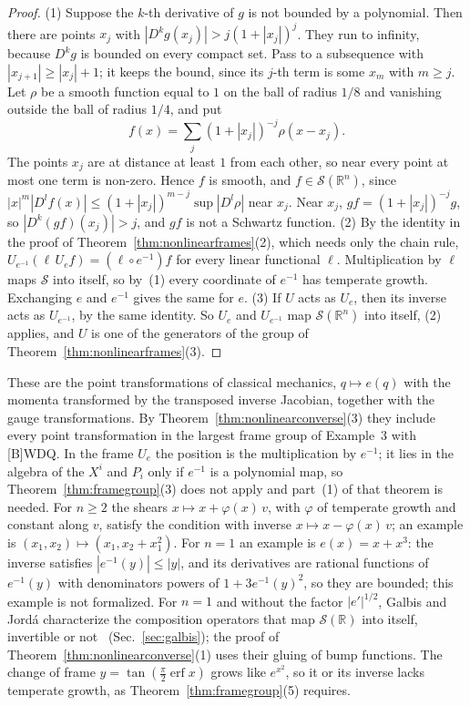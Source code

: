 \documentclass[11pt]{article}
\theoremstyle{definition}
\begin{document}
\begin{proof}
  (1) Suppose the $k$-th derivative of $g$ is not bounded by a polynomial. Then there are points
  $x_j$ with $|D^k g(x_j)| > j(1 + |x_j|)^j$. They run to infinity, because $D^k g$ is bounded on
  every compact set. Pass to a subsequence with $|x_{j+1}| \ge |x_j| + 1$; it keeps the bound,
  since its $j$-th term is some $x_m$ with $m \ge j$. Let $\rho$ be a smooth function equal to $1$
  on the ball of radius $1/8$ and vanishing outside the ball of radius $1/4$, and put
  \[
    f(x) = \sum_j (1 + |x_j|)^{-j} \rho(x - x_j).
  \]
  The points $x_j$ are at distance at least $1$ from each other, so near every point at most one
  term is non-zero. Hence $f$ is smooth, and $f \in \mathcal S(\mathbb R^n)$, since
  $|x|^m |D^l f(x)| \le (1 + |x_j|)^{m-j} \sup|D^l\rho|$ near $x_j$. Near $x_j$,
  $g f = (1 + |x_j|)^{-j} g$, so $|D^k(gf)(x_j)| > j$, and $gf$ is not a Schwartz function.
  (2) By the identity in the proof of Theorem~\ref{thm:nonlinearframes}(2), which needs only the
  chain rule, $U_{e^{-1}}(\ell\, U_e f) = (\ell \circ e^{-1}) f$ for every linear functional $\ell$.
  Multiplication by $\ell$ maps $\mathcal S$ into itself, so by~(1) every coordinate of $e^{-1}$
  has temperate growth. Exchanging $e$ and $e^{-1}$ gives the same for $e$.
  (3) If $U$ acts as $U_e$, then its inverse acts as $U_{e^{-1}}$, by the same identity. So $U_e$
  and $U_{e^{-1}}$ map $\mathcal S(\mathbb R^n)$ into itself, (2) applies, and $U$ is one of the
  generators of the group of Theorem~\ref{thm:nonlinearframes}(3).
\end{proof}

These are the point transformations of classical mechanics, $q \mapsto e(q)$ with the momenta
transformed by the transposed inverse Jacobian, together with the gauge transformations. By
Theorem~\ref{thm:nonlinearconverse}(3) they include every point transformation in the largest
frame group of Example~3 with [B]WDQ. In the
frame $U_e$ the position is the multiplication by $e^{-1}$; it lies in the algebra of the $X^i$
and $P_i$ only if $e^{-1}$ is a polynomial map, so Theorem~\ref{thm:framegroup}(3) does not
apply and part~(1) of that theorem is needed. For $n \ge 2$ the shears
$x \mapsto x + \varphi(x)\,v$, with $\varphi$ of temperate growth and constant along $v$, satisfy
the condition with inverse $x \mapsto x - \varphi(x)\,v$; an example is
$(x_1, x_2) \mapsto (x_1, x_2 + x_1^2)$. For $n = 1$ an example is $e(x) = x + x^3$: the inverse
satisfies $|e^{-1}(y)| \le |y|$, and its derivatives are rational functions of $e^{-1}(y)$
with denominators powers of $1 + 3e^{-1}(y)^2$, so they are bounded; this example is not
formalized. For $n = 1$ and without the factor $|e'|^{1/2}$, Galbis and Jordá characterize the
composition operators that map $\mathcal S(\mathbb R)$ into itself, invertible or
not~\cite[Thm.~2.3]{galbis} (Sec.~\ref{sec:galbis}); the proof of
Theorem~\ref{thm:nonlinearconverse}(1) uses their gluing of bump functions. The change of frame $y = \tan(\frac\pi2\operatorname{erf}x)$ grows like $e^{x^2}$, so it or its
inverse lacks temperate growth, as Theorem~\ref{thm:framegroup}(5) requires.
\end{document}
